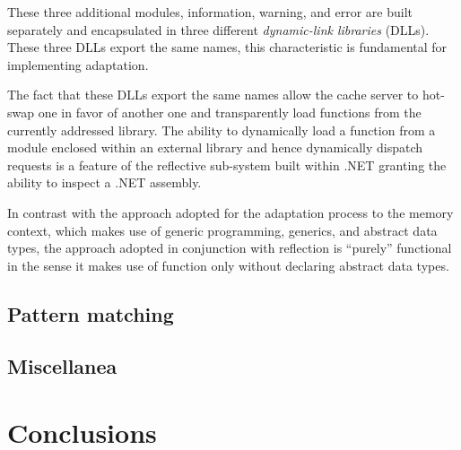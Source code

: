\documentclass[11pt,a4paper]{article}
\begin{document}
These three additional modules, information, warning, and error are built separately and encapsulated in three different \emph{dynamic-link libraries} (DLLs). These three DLLs export the same names, this characteristic is fundamental for implementing adaptation.

The fact that these DLLs export the same names allow the cache server to hot-swap one in favor of another one and transparently load functions from the currently addressed library. The ability to dynamically load a function from a module enclosed within an external library and hence dynamically dispatch requests is a feature of the reflective sub-system built within .NET granting the ability to inspect a .NET assembly.

In contrast with the approach adopted for the adaptation process to the memory context, which makes use of generic programming, generics, and abstract data types, the approach adopted in conjunction with reflection is ``purely'' functional in the sense it makes use of function only without declaring abstract data types.

\subsection{Pattern matching}
\label{section:functionalities:pattern-matching}

\subsection{Miscellanea}
\label{section:functionalities:miscellanea}

\section{Conclusions}
\label{section:conclusions}
\end{document}
